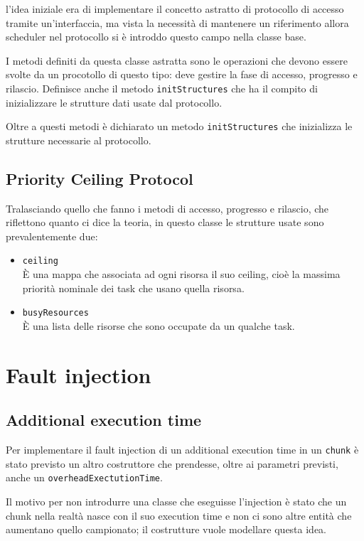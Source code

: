 l'idea iniziale era di implementare il concetto astratto di protocollo di accesso tramite un'interfaccia, ma vista la necessità di mantenere un riferimento allora scheduler nel protocollo si è introddo questo campo nella classe base.

\myskip

I metodi definiti da questa classe astratta sono le operazioni che devono essere svolte da un procotollo di questo tipo: deve gestire la fase di accesso, progresso e rilascio. Definisce anche il metodo \texttt{initStructures} che ha il compito di inizializzare le strutture dati usate dal protocollo.

Oltre a questi metodi è dichiarato un metodo \texttt{initStructures} che inizializza le strutture necessarie al protocollo.

\subsection{Priority Ceiling Protocol}
Tralasciando quello che fanno i metodi di accesso, progresso e rilascio, che riflettono quanto ci dice la teoria, in questo classe le strutture usate sono prevalentemente due:
\begin{itemize}
    \item \texttt{ceiling} \\
        È una mappa che associata ad ogni risorsa il suo ceiling, cioè la massima priorità nominale dei task che usano quella risorsa.
    \item \texttt{busyResources}\\
        È una lista delle risorse che sono occupate da un qualche task.
\end{itemize}

\section{Fault injection}

\subsection{Additional execution time}
Per implementare il fault injection di un additional execution time in un \texttt{chunk} è stato previsto un altro costruttore che prendesse, oltre ai parametri previsti, anche un \texttt{overheadExectutionTime}.

Il motivo per non introdurre una classe che eseguisse l'injection è stato che un chunk nella realtà nasce con il suo execution time e non ci sono altre entità che aumentano quello campionato; il costrutture vuole modellare questa idea.

